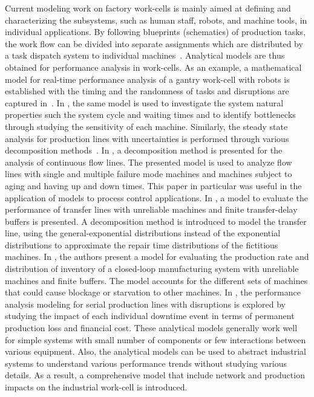 Current modeling work on factory work-cells is mainly aimed at defining and characterizing the subsystems, such as human staff, robots, and machine tools, in individual applications. By following blueprints (schematics) of production tasks, the work flow can be divided into separate assignments which are distributed by a task dispatch system to individual machines~\cite{IkeaBot}. Analytical models are thus obtained for performance analysis in work-cells. As an example, a mathematical model for real-time performance analysis of a gantry work-cell with robots is established with the timing and the randomness of tasks and disruptions are captured in~\cite{8098604}. In \cite{OU2017212}, the same model is used to investigate the system natural properties such the system cycle and waiting times and to identify bottlenecks through studying the sensitivity of each machine. Similarly, the steady state analysis for production lines with uncertainties is performed through various decomposition methods~\cite{Colledani2013,doi:10.1080/00207543.2012.713137,doi:10.1080/00207540500385980}. In \cite{Colledani2013}, a decomposition method is presented for the analysis of continuous flow lines. The presented model is used to analyze flow lines with single and multiple failure mode machines and machines subject to aging and having up and down times.  This paper in particular was useful in the application of models to process control applications. In \cite{doi:10.1080/00207543.2012.713137}, a model to evaluate the performance of transfer lines with unreliable machines and finite transfer-delay buffers is presented. A decomposition method is introduced to model the transfer line, using the general-exponential distributions instead of the exponential distributions to approximate the repair time distributions of the fictitious machines. In \cite{doi:10.1080/00207540500385980}, the authors present a model for evaluating the production rate and distribution of inventory of a closed-loop manufacturing system with unreliable machines and finite buffers. The model accounts for the different sets of machines that could cause blockage or starvation to other machines. In \cite{QChang,Liu2012}, the performance analysis modeling for serial production lines with disruptions is explored by studying the impact of each individual downtime event in terms of permanent production loss and financial cost. These analytical models generally work well for simple systems with small number of components or few interactions between various equipment. Also, the analytical models can be used to abstract industrial systems to understand various performance trends without studying various details. As a result, a comprehensive model that include network and production impacts on the industrial work-cell is introduced.  

